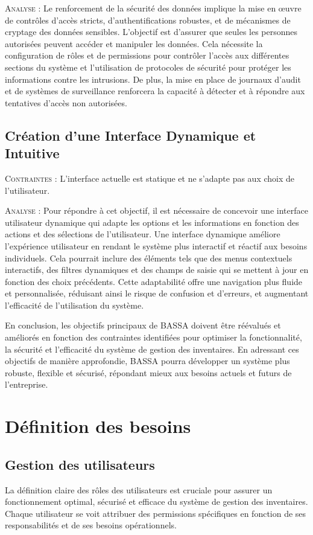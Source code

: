 \documentclass[a4paper, oneside, 12pt, final]{extreport}
\begin{document}
\textsc{Analyse} : Le renforcement de la sécurité des données implique la mise en œuvre de contrôles d’accès stricts, d’authentifications robustes, et de mécanismes de cryptage des données sensibles. L’objectif est d’assurer que seules les personnes autorisées peuvent accéder et manipuler les données. Cela nécessite la configuration de rôles et de permissions pour contrôler l’accès aux différentes sections du système et l’utilisation de protocoles de sécurité pour protéger les informations contre les intrusions. De plus, la mise en place de journaux d’audit et de systèmes de surveillance renforcera la capacité à détecter et à répondre aux tentatives d'accès non autorisées.

\subsection{Création d’une Interface Dynamique et Intuitive}
\textsc{Contraintes} : L’interface actuelle est statique et ne s’adapte pas aux choix de l’utilisateur.

\textsc{Analyse} : Pour répondre à cet objectif, il est nécessaire de concevoir une interface utilisateur dynamique qui adapte les options et les informations en fonction des actions et des sélections de l’utilisateur. Une interface dynamique améliore l’expérience utilisateur en rendant le système plus interactif et réactif aux besoins individuels. Cela pourrait inclure des éléments tels que des menus contextuels interactifs, des filtres dynamiques et des champs de saisie qui se mettent à jour en fonction des choix précédents. Cette adaptabilité offre une navigation plus fluide et personnalisée, réduisant ainsi le risque de confusion et d’erreurs, et augmentant l’efficacité de l’utilisation du système.

En conclusion, les objectifs principaux de BASSA doivent être réévalués et améliorés en fonction des contraintes identifiées pour optimiser la fonctionnalité, la sécurité et l’efficacité du système de gestion des inventaires. En adressant ces objectifs de manière approfondie, BASSA pourra développer un système plus robuste, flexible et sécurisé, répondant mieux aux besoins actuels et futurs de l’entreprise.
\section{Définition des besoins}
\subsection{Gestion des utilisateurs}
La définition claire des rôles des utilisateurs est cruciale pour assurer un fonctionnement optimal, sécurisé et efficace du système de gestion des inventaires. Chaque utilisateur se voit attribuer des permissions spécifiques en fonction de ses responsabilités et de ses besoins opérationnels.
\end{document}
